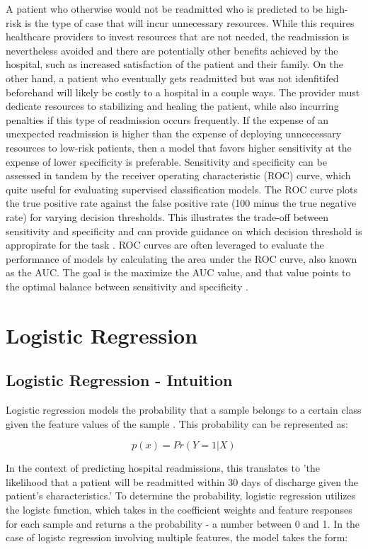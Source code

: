 \documentclass[sigconf]{acmart}
\begin{document}
A patient who otherwise would not be readmitted who is predicted to be high-risk is the type of case that will incur unnecessary resources. While this requires healthcare providers to invest resources that are not needed, the readmission is nevertheless avoided and there are potentially other benefits achieved by the hospital, such as increased satisfaction of the patient and their family. On the other hand, a patient who eventually gets readmitted but was not idenfitifed beforehand will likely be costly to a hospital in a couple ways. The provider must dedicate resources to stabilizing and healing the patient, while also incurring penalties if this type of readmission occurs frequently. If the expense of an unexpected readmission is higher than the expense of deploying unncecessary resources to low-risk patients, then a model that favors higher sensitivity at the expense of lower specificity is preferable.
Sensitivity and specificity can be assessed in tandem by the receiver operating characteristic (ROC) curve, which quite useful for evaluating supervised classification models. The ROC curve plots the true positive rate against the false positive rate (100 minus the true negative rate) for varying decision thresholds. This illustrates the trade-off between sensitivity and specificity and can provide guidance on which decision threshold is appropirate for the task \cite{cite12}. ROC curves are often leveraged to evaluate the performance of models by calculating the area under the ROC curve, also known as the AUC. The goal is the maximize the AUC value, and that value points to the optimal balance between sensitivity and specificity \cite{cite12}.

\section{Logistic Regression}

\subsection{Logistic Regression - Intuition}

Logistic regression models the probability that a sample belongs to a certain class given the feature values of the sample \cite{cite08}. This probability can be represented as:

\[p(x) = Pr(Y = 1 | X)\]

In the context of predicting hospital readmissions, this translates to 'the likelihood that a patient will be readmitted within 30 days of discharge given the patient's characteristics.' To determine the probability, logistic regression utilizes the logistc function, which takes in the coefficient weights and feature responses for each sample and returns a the probability - a number between 0 and 1\cite{cite08}. In the case of logistc regression involving multiple features, the model takes the form:
\end{document}
